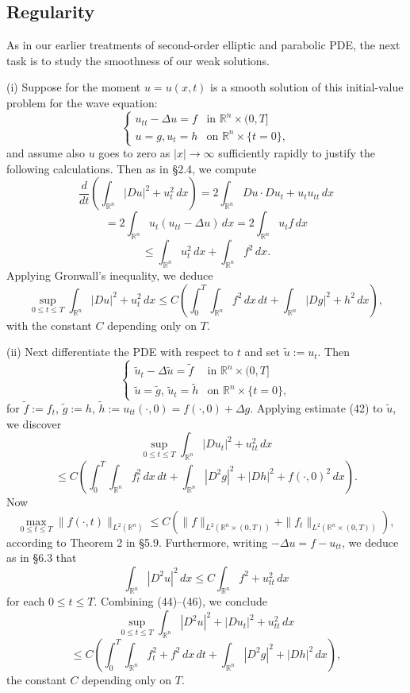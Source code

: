 \subsection{Regularity}

As in our earlier treatments of second-order elliptic and parabolic PDE, the next task is to study the smoothness of our weak solutions.

\begin{remark}
\label{rem:hyperbolic-regularity-motivation}
(i) Suppose for the moment $u = u(x,t)$ is a smooth solution of this initial-value problem for the wave equation:
\[
\begin{cases}
u_{tt} - \Delta u = f & \text{in } \mathbb{R}^n \times (0, T] \\
u = g, u_t = h & \text{on } \mathbb{R}^n \times \{t = 0\},
\end{cases}
\]
and assume also $u$ goes to zero as $|x| \to \infty$ sufficiently rapidly to justify the following calculations. Then as in \S2.4, we compute
\[
\frac{d}{dt} \left( \int_{\mathbb{R}^n} |Du|^2 + u_t^2 \, dx \right) = 2 \int_{\mathbb{R}^n} Du \cdot Du_t + u_t u_{tt} \, dx
\]
\[
= 2 \int_{\mathbb{R}^n} u_t(u_{tt} - \Delta u) \, dx = 2 \int_{\mathbb{R}^n} u_t f \, dx
\]
\[
\leq \int_{\mathbb{R}^n} u_t^2 \, dx + \int_{\mathbb{R}^n} f^2 \, dx.
\]
Applying Gronwall's inequality, we deduce
\[
\sup_{0 \leq t \leq T} \int_{\mathbb{R}^n} |Du|^2 + u_t^2 \, dx \leq C \left( \int_0^T \int_{\mathbb{R}^n} f^2 \, dx\,dt + \int_{\mathbb{R}^n} |Dg|^2 + h^2 \, dx \right),
\tag{42}
\]
with the constant $C$ depending only on $T$.

(ii) Next differentiate the PDE with respect to $t$ and set $\tilde{u} := u_t$. Then
\[
\begin{cases}
\tilde{u}_t - \Delta \tilde{u} = \tilde{f} & \text{in } \mathbb{R}^n \times (0,T] \\
\tilde{u} = \tilde{g}, \, \tilde{u}_t = \tilde{h} & \text{on } \mathbb{R}^n \times \{t = 0\},
\end{cases}
\tag{43}
\]
for $\tilde{f} := f_t$, $\tilde{g} := h$, $\tilde{h} := u_{tt}(\cdot,0) = f(\cdot,0) + \Delta g$. Applying estimate (42) to $\tilde{u}$, we discover
\[
\sup_{0 \leq t \leq T} \int_{\mathbb{R}^n} |Du_t|^2 + u_{tt}^2 \, dx
\]
\[
\leq C \left( \int_0^T \int_{\mathbb{R}^n} f_t^2 \, dx\,dt + \int_{\mathbb{R}^n} |D^2 g|^2 + |Dh|^2 + f(\cdot,0)^2 \, dx \right).
\tag{44}
\]
Now
\[
\max_{0 \leq t \leq T} \|f(\cdot,t)\|_{L^2(\mathbb{R}^n)} \leq C(\|f\|_{L^2(\mathbb{R}^n \times (0,T))} + \|f_t\|_{L^2(\mathbb{R}^n \times (0,T))}),
\tag{45}
\]
according to Theorem 2 in \S5.9. Furthermore, writing $-\Delta u = f - u_{tt}$, we deduce as in \S6.3 that
\[
\int_{\mathbb{R}^n} |D^2 u|^2 \, dx \leq C \int_{\mathbb{R}^n} f^2 + u_{tt}^2 \, dx
\tag{46}
\]
for each $0 \leq t \leq T$. Combining (44)--(46), we conclude
\[
\sup_{0 \leq t \leq T} \int_{\mathbb{R}^n} |D^2 u|^2 + |Du_t|^2 + u_{tt}^2 \, dx
\]
\[
\leq C \left( \int_0^T \int_{\mathbb{R}^n} f_t^2 + f^2 \, dx\,dt + \int_{\mathbb{R}^n} |D^2 g|^2 + |Dh|^2 \, dx \right),
\tag{47}
\]
the constant $C$ depending only on $T$.


\end{remark}
